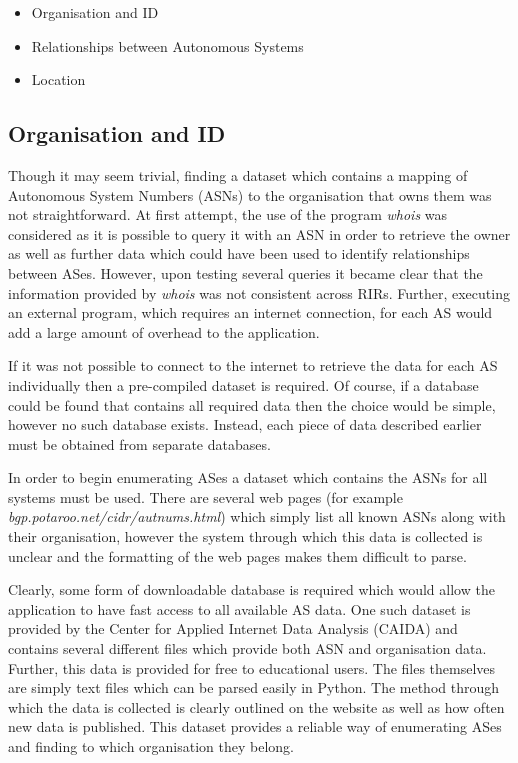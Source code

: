 \begin{itemize}
	\item{Organisation and ID}
	\item{Relationships between Autonomous Systems}
	\item{Location}
\end{itemize}

\subsection{Organisation and ID}
Though it may seem trivial, finding a dataset which contains a mapping of Autonomous System Numbers (ASNs) to the organisation that owns them was not straightforward. At first attempt, the use of the program \textit{whois} was considered as it is possible to query it with an ASN in order to retrieve the owner as well as further data which could have been used to identify relationships between ASes. However, upon testing several queries it became clear that the information provided by \textit{whois} was not consistent across RIRs. Further, executing an external program, which requires an internet connection, for each AS would add a large amount of overhead to the application. 

If it was not possible to connect to the internet to retrieve the data for each AS individually then a pre-compiled dataset is required. Of course, if a database could be found that contains all required data then the choice would be simple, however no such database exists. Instead, each piece of data described earlier must be obtained from separate databases. 

In order to begin enumerating ASes a dataset which contains the ASNs for all systems must be used. There are several web pages (for example \textit{bgp.potaroo.net/cidr/autnums.html}) which simply list all known ASNs along with their organisation, however the system through which this data is collected is unclear and the formatting of the web pages makes them difficult to parse. 

Clearly, some form of downloadable database is required which would allow the application to have fast access to all available AS data. One such dataset is provided by the Center for Applied Internet Data Analysis (CAIDA) and contains several different files which provide both ASN and organisation data. Further, this data is provided for free to educational users. The files themselves are simply text files which can be parsed easily in Python. The method through which the data is collected is clearly outlined on the website as well as how often new data is published. This dataset provides a reliable way of enumerating ASes and finding to which organisation they belong.

